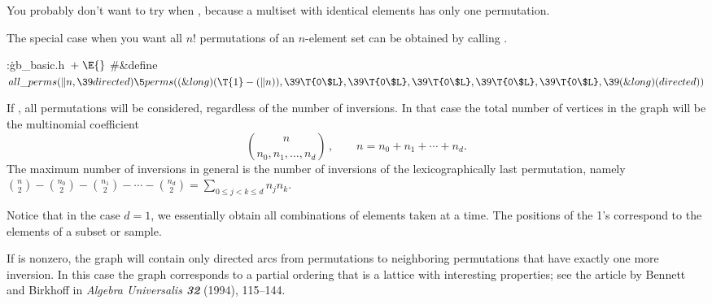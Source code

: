 You probably don't want to try 
when , because a multiset with  identical
elements has only
one permutation.

The special case when you want all $n!$ permutations of an $n$-element set
can be obtained by calling .

\Y\B\4:\.{gb\_basic.h\,}\X${}\mathrel+\E{}$\6
\8\#\&{define} ${}\\{all\_perms}(\|n,\39\\{directed})\5\\{perms}((\&{long})(%
\T{1}-(\|n)),\39\T{0\$L},\39\T{0\$L},\39\T{0\$L},\39\T{0\$L},\39\T{0\$L},\39(%
\&{long})(\\{directed})){}$\par
\fi

If , all permutations will be considered,
regardless of
the number of inversions. In that case the total number of vertices in
the graph will be the multinomial coefficient $${n\choose
n_0,n_1,\ldots,n_d}\,,\qquad n=n_0+n_1+\cdots+n_d.$$ The maximum
number of inversions in general is the number of inversions of the
lexicographically last permutation, namely ${n\choose2}-{n_0\choose2}-
{n_1\choose2}-\cdots-{n_d\choose2}=\sum_{0\le j<k\le d}n_jn_k$.

\vskip1pt
Notice that in the case $d=1$, we essentially obtain all combinations of
 elements taken  at a time. The positions of the
1's correspond
to the elements of a subset or sample.

If  is nonzero, the graph will contain only directed arcs
from permutations to neighboring permutations that have exactly one more
inversion. In this case the graph corresponds to a partial ordering that is a
lattice with interesting properties; see the article by Bennett and Birkhoff
in {\sl Algebra Universalis\/ \bf32} (1994), 115--144.

